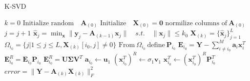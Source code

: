 \begin{algorithm}[H]
\caption{K-SVD}
\begin{algorithmic}[1]
			\State$k = 0$			
			\State$\text{Initialize random} \quad  \textbf{A}_{(0)}$            
			\State$\text{Initialize} \quad \textbf{X}_{(0)}=\mathbf{0}$
			\State
            \State$\text{normilize columns of} \ \textbf{A}_{(0)}$
                \State $j = j+1$
                 
                	\State$\hat{\textbf{x}}_{j} = \min_{\textbf{x}} \|\textbf{y}_j -\textbf{A}_{(k-1)}\textbf{x}_{j}\| \quad s.t. \quad \|\textbf{x}_{j}\| \leq k_0 $
				\EndFor
				\State$\textbf{X}_{(k)}=\{\hat{\textbf{x}}_{j}\}_{j=1}^{L}$
					\State$\Omega_{i_0}=\{j|1\leq j \leq L , \textbf{X}_{(k)}[i_0,j]\neq 0\}$
					\State$\text{From} \ \Omega_{i_0} \ \text{define} \ \textbf{P}_{i_0} $
					\State$\textbf{E}_{i_0} =  \textbf{Y}- \sum_{i\neq i_{0}}^{M} \textbf{a}_i\textbf{x}_i^{T}$
					\State$\textbf{E}_{i_0}^R = \textbf{E}_{i_0}\textbf{P}_{i_0}$
					\State$\textbf{E}_{i_0}^R=\textbf{U}\boldsymbol{\Sigma}\textbf{V}^T$ 
					\State$\textbf{a}_{i_0}\gets \textbf{u}_{1}$ 
					\State$\left( \textbf{x}_{i_0}^T\right)^R \gets \sigma_{1}\textbf{v}_{1}$
					\State$\textbf{x}_{i_0}^T \gets \left( \textbf{x}_{i_0}^T\right)^R \textbf{P}_{i_0}^T $ 
				\EndFor
				\State$error =\| \textbf{Y}-\textbf{A}_{(k)}\textbf{X}_{(k)}\|_{F}^2 $
          		\EndWhile
            \EndProcedure
        \end{algorithmic} 
        \label{alg:K_SVD}
\end{algorithm}


